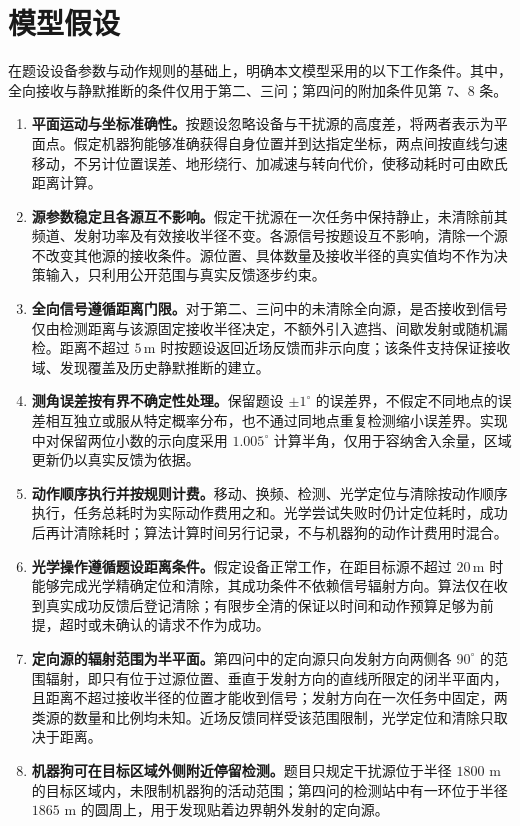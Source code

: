 \section{模型假设}\label{sec:model-assumptions}

在题设设备参数与动作规则的基础上，明确本文模型采用的以下工作条件。其中，全向接收与静默推断的条件仅用于第二、三问；第四问的附加条件见第 7、8 条。

\begin{enumerate}
  \item \textbf{平面运动与坐标准确性。}按题设忽略设备与干扰源的高度差，将两者表示为平面点。假定机器狗能够准确获得自身位置并到达指定坐标，两点间按直线匀速移动，不另计位置误差、地形绕行、加减速与转向代价，使移动耗时可由欧氏距离计算。

  \item \textbf{源参数稳定且各源互不影响。}假定干扰源在一次任务中保持静止，未清除前其频道、发射功率及有效接收半径不变。各源信号按题设互不影响，清除一个源不改变其他源的接收条件。源位置、具体数量及接收半径的真实值均不作为决策输入，只利用公开范围与真实反馈逐步约束。

  \item \textbf{全向信号遵循距离门限。}对于第二、三问中的未清除全向源，是否接收到信号仅由检测距离与该源固定接收半径决定，不额外引入遮挡、间歇发射或随机漏检。距离不超过 $5\,\mathrm{m}$ 时按题设返回近场反馈而非示向度；该条件支持保证接收域、发现覆盖及历史静默推断的建立。

  \item \textbf{测角误差按有界不确定性处理。}保留题设 $\pm1^\circ$ 的误差界，不假定不同地点的误差相互独立或服从特定概率分布，也不通过同地点重复检测缩小误差界。实现中对保留两位小数的示向度采用 $1.005^\circ$ 计算半角，仅用于容纳舍入余量，区域更新仍以真实反馈为依据。

  \item \textbf{动作顺序执行并按规则计费。}移动、换频、检测、光学定位与清除按动作顺序执行，任务总耗时为实际动作费用之和。光学尝试失败时仍计定位耗时，成功后再计清除耗时；算法计算时间另行记录，不与机器狗的动作计费用时混合。

  \item \textbf{光学操作遵循题设距离条件。}假定设备正常工作，在距目标源不超过 $20\,\mathrm{m}$ 时能够完成光学精确定位和清除，其成功条件不依赖信号辐射方向。算法仅在收到真实成功反馈后登记清除；有限步全清的保证以时间和动作预算足够为前提，超时或未确认的请求不作为成功。

  \item \textbf{定向源的辐射范围为半平面。}第四问中的定向源只向发射方向两侧各 $90^\circ$ 的范围辐射，即只有位于过源位置、垂直于发射方向的直线所限定的闭半平面内，且距离不超过接收半径的位置才能收到信号；发射方向在一次任务中固定，两类源的数量和比例均未知。近场反馈同样受该范围限制，光学定位和清除只取决于距离。

  \item \textbf{机器狗可在目标区域外侧附近停留检测。}题目只规定干扰源位于半径 $1800$ m 的目标区域内，未限制机器狗的活动范围；第四问的检测站中有一环位于半径 $1865$ m 的圆周上，用于发现贴着边界朝外发射的定向源。
\end{enumerate}

